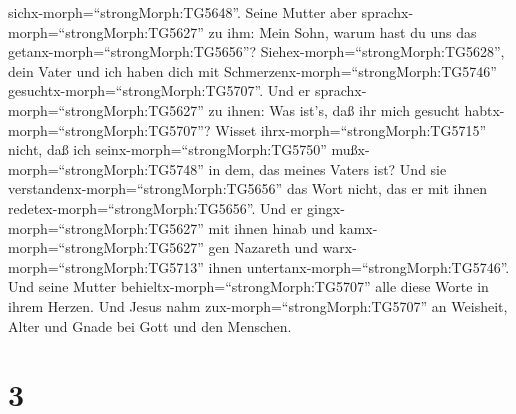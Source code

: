 sichx-morph=``strongMorph:TG5648''. Seine Mutter aber
sprachx-morph=``strongMorph:TG5627'' zu ihm: Mein Sohn, warum hast du
uns das getanx-morph=``strongMorph:TG5656''?
Siehex-morph=``strongMorph:TG5628'', dein Vater und ich haben dich mit
Schmerzenx-morph=``strongMorph:TG5746''
gesuchtx-morph=``strongMorph:TG5707''.  Und er
sprachx-morph=``strongMorph:TG5627'' zu ihnen: Was ist's, daß ihr mich
gesucht habtx-morph=``strongMorph:TG5707''? Wisset
ihrx-morph=``strongMorph:TG5715'' nicht, daß ich
seinx-morph=``strongMorph:TG5750'' mußx-morph=``strongMorph:TG5748'' in
dem, das meines Vaters ist?  Und sie
verstandenx-morph=``strongMorph:TG5656'' das Wort nicht, das er mit
ihnen redetex-morph=``strongMorph:TG5656''.  Und er
gingx-morph=``strongMorph:TG5627'' mit ihnen hinab und
kamx-morph=``strongMorph:TG5627'' gen Nazareth und
warx-morph=``strongMorph:TG5713'' ihnen
untertanx-morph=``strongMorph:TG5746''. Und seine Mutter
behieltx-morph=``strongMorph:TG5707'' alle diese Worte in ihrem Herzen.
 Und Jesus nahm zux-morph=``strongMorph:TG5707'' an
Weisheit, Alter und Gnade bei Gott und den Menschen.

\hypertarget{section-2}{%
\section{3}\label{section-2}}

